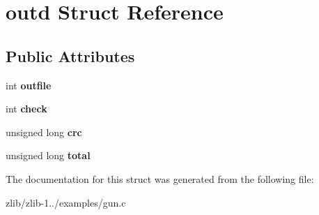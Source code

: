 \hypertarget{structoutd}{\section{outd Struct Reference}
\label{structoutd}
}
\subsection*{Public Attributes}
\begin{DoxyCompactItemize}
\item 
\hypertarget{structoutd_a5082d9db14154a733403decdf852e9e8}{int {\bfseries outfile}}\label{structoutd_a5082d9db14154a733403decdf852e9e8}

\item 
\hypertarget{structoutd_a3e4575647d91f09865b59b4097f16583}{int {\bfseries check}}\label{structoutd_a3e4575647d91f09865b59b4097f16583}

\item 
\hypertarget{structoutd_a5408635b43ee66015daca92aa117aa51}{unsigned long {\bfseries crc}}\label{structoutd_a5408635b43ee66015daca92aa117aa51}

\item 
\hypertarget{structoutd_a14d1b98be9ddb6c511a029815f96874a}{unsigned long {\bfseries total}}\label{structoutd_a14d1b98be9ddb6c511a029815f96874a}

\end{DoxyCompactItemize}


The documentation for this struct was generated from the following file\+:\begin{DoxyCompactItemize}
\item 
zlib/zlib-\/1../examples/gun.\+c\end{DoxyCompactItemize}
